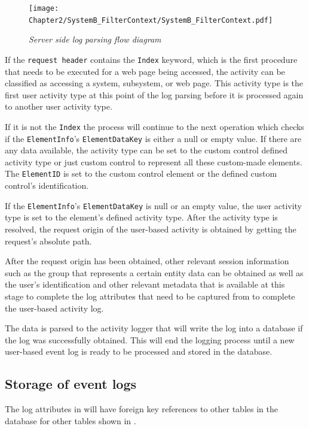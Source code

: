 \clearpage

\begin{figure}[!htb]
	\centering
	\texttt{[image: Chapter2/SystemB\_FilterContext/SystemB\_FilterContext.pdf]}
	\caption[Server side log parsing flow diagram]
	{\textit{Server side log parsing flow diagram}}\label{fig:ch2_loggingParse}
\end{figure}

\clearpage

If the \texttt{request header} contains the \texttt{Index} keyword, which is the first procedure that needs to be executed for a web page being accessed, the activity can be classified as accessing a system, subsystem, or web page. This activity type is the first user activity type at this point of the log parsing before it is processed again to another user activity type. \par If it is not the \texttt{Index} the process will continue to the next operation which checks if the \texttt{ElementInfo}'s \texttt{ElementDataKey} is either a null or empty value. If there are any data available, the activity type can be set to the custom control defined activity type or just custom control to represent all these custom-made elements. The \texttt{ElementID} is set to the custom control element or the defined custom control's identification. \par If the \texttt{ElementInfo}'s \texttt{ElementDataKey} is null or an empty value, the user activity type is set to the element's defined activity type. After the activity type is resolved, the request origin of the user-based activity is obtained by getting the request's absolute path.\par After the request origin has been obtained, other relevant session information such as the group that represents a certain entity data can be obtained as well as the user's identification and other relevant metadata that is available at this stage to complete the log attributes that need to be captured from  to complete the user-based activity log.\par The data is parsed to the activity logger that will write the log into a database if the log was successfully obtained. This will end the logging process until a new user-based event log is ready to be processed and stored in the database.

\subsection{Storage of event logs}
The log attributes in  will have foreign key references to other tables in the database for other tables shown in . 

